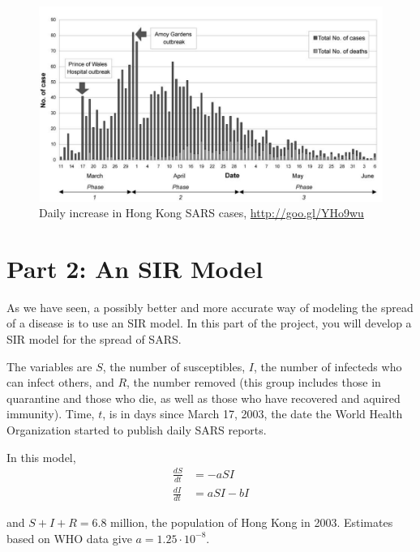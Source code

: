 \documentclass
[justified,nohyper]
{tufte-handout}
\begin{document}
\begin{figure}
\includegraphics[scale=0.3]{dailyincrease.png}
\caption{\label{dailyinc} Daily increase in Hong Kong SARS cases, \url{http://goo.gl/YHo9wu}}
\end{figure}

\newpage

\section{Part 2: An SIR Model}
As we have seen, a possibly better and more accurate way of modeling the spread of a disease is to use an SIR model. In this part of the project, you will develop a SIR model for the spread of SARS.

The variables are $S$, the number of susceptibles, $I$, the number of infecteds who can infect others, and $R$, the number removed (this group includes those in quarantine and those who die, as well as those who have recovered and aquired immunity). Time, $t$, is in days since March 17, 2003, the date the World Health Organization started to publish daily SARS reports.

In this model,
\begin{align*}
    \frac{dS}{dt} &= -aSI \\
    \frac{dI}{dt} &= aSI - bI
\end{align*}

and $S+I+R = 6.8$ million, the population of Hong Kong in 2003.  Estimates based on WHO data give $a=1.25\cdot 10^{-8}$.
\end{document}
